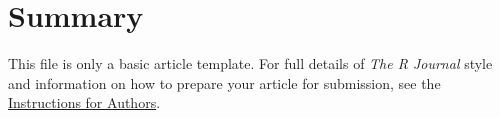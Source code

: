 \section{Summary}

This file is only a basic article template. For full details of \emph{The R Journal} style and information on how to prepare your article for submission, see the \href{https://journal.r-project.org/share/author-guide.pdf}{Instructions for Authors}.



\address{Author One\\
  Affiliation\\
  Address\\
  Country\\
  (ORCiD if desired)\\
  }

\address{Author Two\\
  Affiliation\\
  Address\\
  Country\\
  (ORCiD if desired)\\
  }

\address{Author Three\\
  Affiliation\\
  Address\\
  Country\\
  (ORCiD if desired)\\
  }
